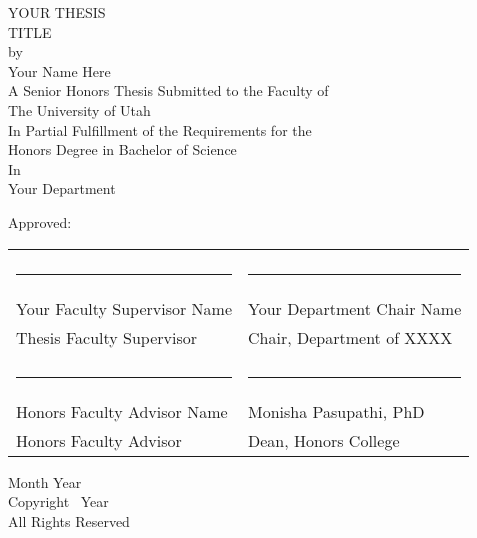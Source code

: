 \documentclass[12pt]{report}
\begin{document}
\renewcommand{\contentsname}{TABLE OF CONTENTS}


\begin{titlepage}
\begin{center}
    YOUR THESIS\\
    \bigskip
    TITLE\\
    \bigskip
    \bigskip
    \bigskip
    by\\
    \bigskip
    Your Name Here\\
    \bigskip
    \bigskip
    \bigskip
    A Senior Honors Thesis Submitted to the Faculty of\\
    The University of Utah\\
    In Partial Fulfillment of the Requirements for the\\
    \bigskip
    Honors Degree in Bachelor of Science\\
    \bigskip
    \bigskip
    \bigskip
    In \\
    \bigskip
    Your Department
    \bigskip
    \bigskip
\end{center}
    Approved:
    \begin{center}
        \begin{tabularx}{\textwidth}{XX}
        \bigskip \bigskip \bigskip \\
        \rule{6cm}{0.4pt} & \rule{6cm}{0.4pt} \\
        Your Faculty Supervisor Name & Your Department Chair Name \\
        Thesis Faculty Supervisor & Chair, Department of XXXX \\
        \bigskip \bigskip \bigskip \\
        \rule{6cm}{0.4pt} & \rule{6cm}{0.4pt} \\
        Honors Faculty Advisor Name & Monisha Pasupathi, PhD \\
        Honors Faculty Advisor & Dean, Honors College \\
        \end{tabularx}
    \end{center}

\begin{center}
    \bigskip
    \bigskip
    \bigskip
    \bigskip

    Month Year\\
    Copyright \textcopyright\ Year\\
    All Rights Reserved
\end{center}
\end{titlepage}
\end{document}
